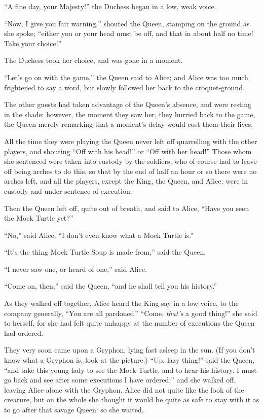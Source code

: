 \documentclass[11pt,openany,oneside]{book}
\begin{document}
“A fine day, your Majesty!” the Duchess began in a low, weak voice. 

“Now, I give you fair warning,” shouted the Queen, stamping on the ground as she spoke; “either you or your head must be off, and that in about half no time! Take your choice!” 

The Duchess took her choice, and was gone in a moment. 

“Let’s go on with the game,” the Queen said to Alice; and Alice was too much frightened to say a word, but slowly followed her back to the croquet-ground. 

The other guests had taken advantage of the Queen’s absence, and were resting in the shade: however, the moment they saw her, they hurried back to the game, the Queen merely remarking that a moment’s delay would cost them their lives. 

All the time they were playing the Queen never left off quarrelling with the other players, and shouting “Off with his head!” or “Off with her head!” Those whom she sentenced were taken into custody by the soldiers, who of course had to leave off being arches to do this, so that by the end of half an hour or so there were no arches left, and all the players, except the King, the Queen, and Alice, were in custody and under sentence of execution. 

Then the Queen left off, quite out of breath, and said to Alice, “Have you seen the Mock Turtle yet?” 

“No,” said Alice. “I don’t even know what a Mock Turtle is.” 

“It’s the thing Mock Turtle Soup is made from,” said the Queen. 

“I never saw one, or heard of one,” said Alice. 

“Come on, then,” said the Queen, “and he shall tell you his history.” 

As they walked off together, Alice heard the King say in a low voice, to the company generally, “You are all pardoned.” “Come, {\em that’s\/} a good thing!” she said to herself, for she had felt quite unhappy at the number of executions the Queen had ordered. 

They very soon came upon a Gryphon, lying fast asleep in the sun. (If you don’t know what a Gryphon is, look at the picture.) “Up, lazy thing!” said the Queen, “and take this young lady to see the Mock Turtle, and to hear his history. I must go back and see after some executions I have ordered;” and she walked off, leaving Alice alone with the Gryphon. Alice did not quite like the look of the creature, but on the whole she thought it would be quite as safe to stay with it as to go after that savage Queen: so she waited. 
\end{document}
